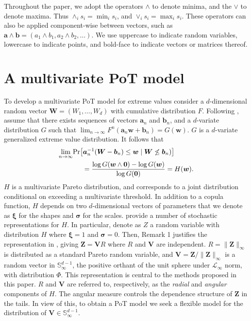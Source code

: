 Throughout the paper, we adopt the operators $\wedge$ to denote minima, and 
    the $\vee$ to denote maxima.  Thus $\wedge_i s_i = \min_i s_i$, and 
    $\vee_i s_i = \max_i s_i$.  These operators can also be applied component-wise 
    between vectors, such as $\bm{a}\wedge\bm{b} = (a_1\wedge b_1, a_2\wedge b_2,\ldots)$.  
    We use uppercase to indicate random variables, lowercase to indicate points, and
    bold-face to indicate vectors or matrices thereof.
  
\section{A multivariate PoT model\label{sec:multivariatepot}}
To develop a multivariate PoT model for extreme values consider a 
    $d$-dimensional random vector $\bm{W} = (W_1, \ldots ,W_d)$ with
    cumulative distribution $F$. Following \cite{RoSeWa2018a}, assume 
    that there exists sequences of vectors $\bm{a}_n$ and $\bm{b}_n$,
    and a $d$-variate distribution $G$ such that 
    $\lim_{n\rightarrow\infty} F^n(\bm{a}_n \bm{w} + \bm{b}_n) = 
    G(\bm{w})$. $G$ is a $d$-variate generalized extreme value 
    distribution. It follows that
    \begin{equation*}
        \begin{aligned}
        \lim\limits_{n\rightarrow\infty} &\prob{\bm{a}^{-1}_n (\bm{W} - \bm{b}_n) 
      \leq \bm{w} \mid \bm{W} \not\leq \bm{b}_n)} \\ 
        &\hspace{0.5cm}= \frac{\log G(\bm{w} \wedge \bm{0}) 
        - \log G(\bm{w}) }{\log G(\bm{0})} = H(\bm{w}).
        \end{aligned}
    \end{equation*}
    $H$ is a multivariate Pareto distribution, and corresponds to a joint
    distribution conditional on exceeding a multivariate threshold. In addition to
    a copula function, $H$ depends on two $d$-dimensional vectors of 
    parameters that we denote as $\bm{\xi}$ for the shapes and $\bm{\sigma}$ 
    for the scales. \cite{RoSeWa2018a} provide a number of stochastic 
    representations for $H$.  In particular, denote as $Z$ a
    random variable with distribution $H$ where $\bm{\xi}= 1$ and 
    $\bm{\sigma} = 0$.  Then, Remark 1 justifies the representation in 
    \cite{ferreira2014}, giving $\bm{Z} = \bm{V}R$
    where $R$ and $\bm{V}$ are independent. $R = \|\bm{Z}\|_\infty$ is 
    distributed as a standard Pareto random variable, and $\bm{V} = 
    \bm{Z}/\|\bm{Z}\|_\infty$ is a random vector in  
    $\mathbb{S}_{\infty}^{d-1}$, the positive orthant of the 
    unit sphere under $\mathcal{L}_{\infty}$ norm, with distribution $\Phi$. 
    This representation is central to the methods proposed in this paper.
    $R$ and $\bm{V}$ are referred to, respectively, as the {\em radial} 
    and {\em angular} components of $H$. The angular measure controls 
    the dependence  structure of $\bm{Z}$  in the tails. In view of 
    this, to obtain a  PoT model we seek a flexible model for the 
    distribution of $\bm{V} \in {\mathbb S}_{\infty}^{d-1}$.

